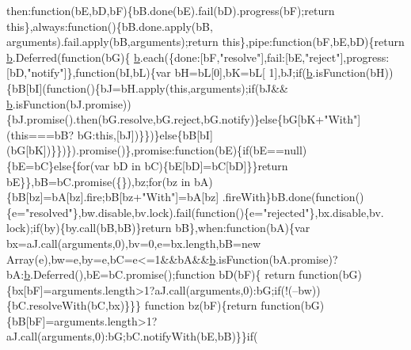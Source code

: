 \begin{DoxyCode}
      then:\textcolor{keyword}{function}(bE,bD,bF)\{bB.done(bE).fail(bD).progress(bF);\textcolor{keywordflow}{return} \textcolor{keyword}{this}\},always:\textcolor{keyword}{function}()\{bB.done.apply(bB,
      arguments).fail.apply(bB,arguments);\textcolor{keywordflow}{return} \textcolor{keyword}{this}\},pipe:\textcolor{keyword}{function}(bF,bE,bD)\{\textcolor{keywordflow}{return} \hyperlink{a00039_aa4026ad5544b958e54ce5e106fa1c805}{b}.Deferred(\textcolor{keyword}{function}(bG)\{
      \hyperlink{a00039_aa4026ad5544b958e54ce5e106fa1c805}{b}.each(\{done:[bF,\textcolor{stringliteral}{"resolve"}],fail:[bE,\textcolor{stringliteral}{"reject"}],progress:[bD,\textcolor{stringliteral}{"notify"}]\},\textcolor{keyword}{function}(bI,bL)\{var bH=bL[0],bK=bL[
      1],bJ;\textcolor{keywordflow}{if}(\hyperlink{a00039_aa4026ad5544b958e54ce5e106fa1c805}{b}.isFunction(bH))\{bB[bI](\textcolor{keyword}{function}()\{bJ=bH.apply(\textcolor{keyword}{this},arguments);\textcolor{keywordflow}{if}(bJ&&
      \hyperlink{a00039_aa4026ad5544b958e54ce5e106fa1c805}{b}.isFunction(bJ.promise))\{bJ.promise().then(bG.resolve,bG.reject,bG.notify)\}\textcolor{keywordflow}{else}\{bG[bK+\textcolor{stringliteral}{"With"}](\textcolor{keyword}{this}===bB?
      bG:\textcolor{keyword}{this},[bJ])\}\})\}\textcolor{keywordflow}{else}\{bB[bI](bG[bK])\}\})\}).promise()\},promise:\textcolor{keyword}{function}(bE)\{\textcolor{keywordflow}{if}(bE==null)\{bE=bC\}\textcolor{keywordflow}{else}\{\textcolor{keywordflow}{for}(var bD 
      in bC)\{bE[bD]=bC[bD]\}\}\textcolor{keywordflow}{return} bE\}\},bB=bC.promise(\{\}),bz;\textcolor{keywordflow}{for}(bz in bA)\{bB[bz]=bA[bz].fire;bB[bz+\textcolor{stringliteral}{"With"}]=bA[bz]
      .fireWith\}bB.done(\textcolor{keyword}{function}()\{e=\textcolor{stringliteral}{"resolved"}\},bw.disable,bv.lock).fail(\textcolor{keyword}{function}()\{e=\textcolor{stringliteral}{"rejected"}\},bx.disable,bv.
      lock);\textcolor{keywordflow}{if}(by)\{by.call(bB,bB)\}\textcolor{keywordflow}{return} bB\},when:\textcolor{keyword}{function}(bA)\{var bx=aJ.call(arguments,0),bv=0,e=bx.length,bB=\textcolor{keyword}{new} 
      Array(e),bw=e,by=e,bC=e<=1&&bA&&\hyperlink{a00039_aa4026ad5544b958e54ce5e106fa1c805}{b}.isFunction(bA.promise)?bA:\hyperlink{a00039_aa4026ad5544b958e54ce5e106fa1c805}{b}.Deferred(),bE=bC.promise();\textcolor{keyword}{function} bD(bF)\{\textcolor{keywordflow}{
      return} \textcolor{keyword}{function}(bG)\{bx[bF]=arguments.length>1?aJ.call(arguments,0):bG;\textcolor{keywordflow}{if}(!(--bw))\{bC.resolveWith(bC,bx)\}\}\}\textcolor{keyword}{
      function} bz(bF)\{\textcolor{keywordflow}{return} \textcolor{keyword}{function}(bG)\{bB[bF]=arguments.length>1?aJ.call(arguments,0):bG;bC.notifyWith(bE,bB)\}\}\textcolor{keywordflow}{if}(

\end{DoxyCode}
